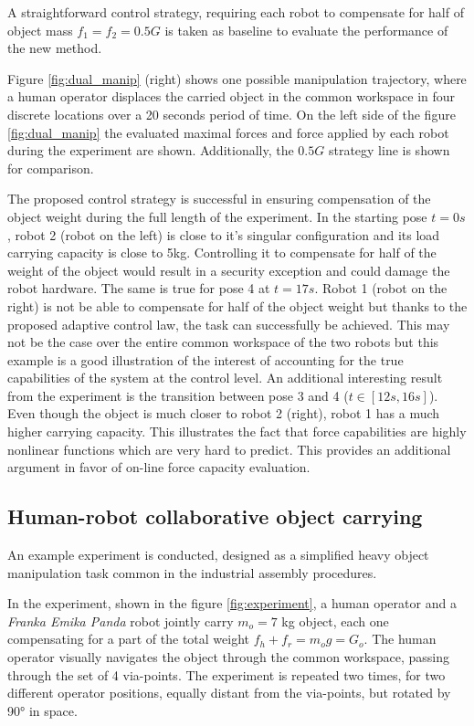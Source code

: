 A straightforward control strategy, requiring each robot to compensate for half of object mass $f_1=f_2=0.5G$ is taken as baseline to evaluate the performance of the new method.

Figure \ref{fig:dual_manip} (right) shows one possible manipulation trajectory, where a human operator displaces the carried object in the common workspace in four discrete locations over a 20 seconds period of time. On the left side of the figure \ref{fig:dual_manip} the evaluated maximal forces and force applied by each robot during the experiment are shown. Additionally, the $0.5G$ strategy line is shown for comparison. 

The proposed control strategy is successful in ensuring  compensation of the object weight during the full length of the experiment. In the starting pose $t=0s$, robot 2 (robot on the left) is close to it's singular configuration and its load carrying capacity is close to 5kg. Controlling it to compensate for half of the weight of the object would result in a security exception and could damage the robot hardware. The same is true for pose 4 at $t=17s$. Robot 1 (robot on the right) is not be able to compensate for half of the object weight but thanks to the proposed adaptive control law, the task can successfully be achieved. This may not be the case over the entire common workspace of the two robots but this example is a good illustration of the interest of accounting for the true capabilities of the system at the control level.  An additional interesting result from the experiment is the transition between pose 3 and 4 ($t \in [12s,16s]$). Even though the object is much closer to robot 2 (right), robot 1 has a much higher carrying capacity. This illustrates the fact that force capabilities are highly nonlinear functions which are very hard to predict. This provides an additional argument in favor of on-line force capacity evaluation. 


\subsection{Human-robot collaborative object carrying}
\label{ch:human_robot_carrying}

An example experiment is conducted, designed as a simplified heavy object manipulation task common in the industrial assembly procedures. 

In the experiment, shown in the figure \ref{fig:experiment}, a human operator and a \textit{Franka Emika Panda} robot jointly carry $m_o\!=\!7$ kg object, each one compensating for a part of the total weight {$ f_h\! +\! f_r\! =\! m_og\! =\! G_o $}. The human operator {visually} navigates the object through the common workspace, passing through {the set of} 4 via-points. 
{The experiment is repeated two times, 
for two different operator positions, equally distant from the via-points, but rotated by 90° in space.}

